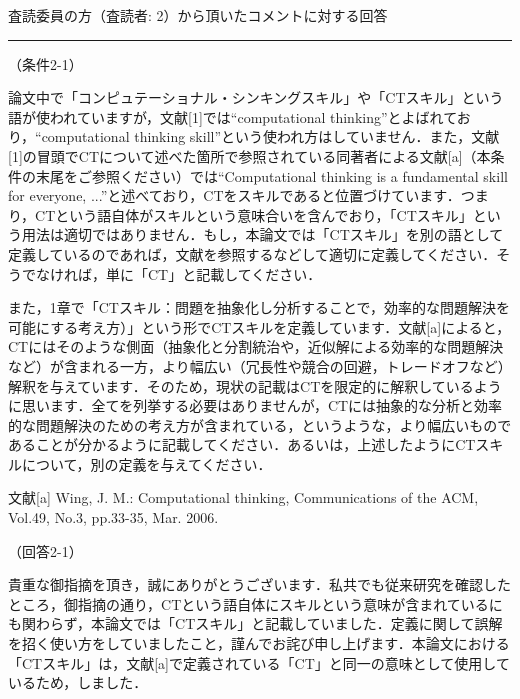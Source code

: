 \documentclass{jarticle} %
\def\section#1{ \vspace{3pc} {\large \gt #1} \vspace{1pc} \hrule }
\def\subsection#1{ \vspace{1pc} {\gt #1} }
\begin{document}
\newpage
\section{査読委員の方（査読者: 2）から頂いたコメントに対する回答}
\subsection{（条件2-1）}

論文中で「コンピュテーショナル・シンキングスキル」や「CTスキル」という語が使われていますが，文献[1]では``computational thinking''とよばれており，``computational thinking skill''という使われ方はしていません．また，文献[1]の冒頭でCTについて述べた箇所で参照されている同著者による文献[a]（本条件の末尾をご参照ください）では``Computational thinking is a fundamental skill for everyone, ...''と述べており，CTをスキルであると位置づけています．つまり，CTという語自体がスキルという意味合いを含んでおり，「CTスキル」という用法は適切ではありません．もし，本論文では「CTスキル」を別の語として定義しているのであれば，文献を参照するなどして適切に定義してください．そうでなければ，単に「CT」と記載してください．

また，1章で「CTスキル：問題を抽象化し分析することで，効率的な問題解決を可能にする考え方）」という形でCTスキルを定義しています．文献[a]によると，CTにはそのような側面（抽象化と分割統治や，近似解による効率的な問題解決など）が含まれる一方，より幅広い（冗長性や競合の回避，トレードオフなど）解釈を与えています．そのため，現状の記載はCTを限定的に解釈しているように思います．全てを列挙する必要はありませんが，CTには抽象的な分析と効率的な問題解決のための考え方が含まれている，というような，より幅広いものであることが分かるように記載してください．あるいは，上述したようにCTスキルについて，別の定義を与えてください．

\hspace{3em}

\noindent 文献[a] Wing, J. M.: Computational thinking, Communications of the ACM, Vol.49, No.3, pp.33-35, Mar. 2006.


\subsection{（回答2-1）}

貴重な御指摘を頂き，誠にありがとうございます．私共でも従来研究を確認したところ，御指摘の通り，CTという語自体にスキルという意味が含まれているにも関わらず，本論文では「CTスキル」と記載していました．定義に関して誤解を招く使い方をしていましたこと，謹んでお詫び申し上げます．本論文における「CTスキル」は，文献[a]で定義されている「CT」と同一の意味として使用しているため，しました．
\end{document}
